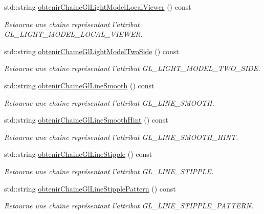 \begin{DoxyCompactItemize}
std\-::string \hyperlink{group__utilitaire_gad3dbc66405e9f773549840afceebda51}{obtenir\-Chaine\-Gl\-Light\-Model\-Local\-Viewer} () const 
\begin{DoxyCompactList}\small\item\em Retourne une chaîne représentant l'attribut G\-L\-\_\-\-L\-I\-G\-H\-T\-\_\-\-M\-O\-D\-E\-L\-\_\-\-L\-O\-C\-A\-L\-\_\-\-V\-I\-E\-W\-E\-R. \end{DoxyCompactList}\item 
std\-::string \hyperlink{group__utilitaire_gab355049dd400e05dcf9057355f954b2d}{obtenir\-Chaine\-Gl\-Light\-Model\-Two\-Side} () const 
\begin{DoxyCompactList}\small\item\em Retourne une chaîne représentant l'attribut G\-L\-\_\-\-L\-I\-G\-H\-T\-\_\-\-M\-O\-D\-E\-L\-\_\-\-T\-W\-O\-\_\-\-S\-I\-D\-E. \end{DoxyCompactList}\item 
std\-::string \hyperlink{group__utilitaire_ga3823c538863f06203e0f72df0af8e517}{obtenir\-Chaine\-Gl\-Line\-Smooth} () const 
\begin{DoxyCompactList}\small\item\em Retourne une chaîne représentant l'attribut G\-L\-\_\-\-L\-I\-N\-E\-\_\-\-S\-M\-O\-O\-T\-H. \end{DoxyCompactList}\item 
std\-::string \hyperlink{group__utilitaire_ga259303d6900794169347807035689bc8}{obtenir\-Chaine\-Gl\-Line\-Smooth\-Hint} () const 
\begin{DoxyCompactList}\small\item\em Retourne une chaîne représentant l'attribut G\-L\-\_\-\-L\-I\-N\-E\-\_\-\-S\-M\-O\-O\-T\-H\-\_\-\-H\-I\-N\-T. \end{DoxyCompactList}\item 
std\-::string \hyperlink{group__utilitaire_gae6a2fafc56ddcffeb516c7e7451ee620}{obtenir\-Chaine\-Gl\-Line\-Stipple} () const 
\begin{DoxyCompactList}\small\item\em Retourne une chaîne représentant l'attribut G\-L\-\_\-\-L\-I\-N\-E\-\_\-\-S\-T\-I\-P\-P\-L\-E. \end{DoxyCompactList}\item 
std\-::string \hyperlink{group__utilitaire_gaf5594a01ce0e3ce08073c9d8adc2dc7d}{obtenir\-Chaine\-Gl\-Line\-Stipple\-Pattern} () const 
\begin{DoxyCompactList}\small\item\em Retourne une chaîne représentant l'attribut G\-L\-\_\-\-L\-I\-N\-E\-\_\-\-S\-T\-I\-P\-P\-L\-E\-\_\-\-P\-A\-T\-T\-E\-R\-N. \end{DoxyCompactList}\item 

\end{DoxyCompactItemize}
